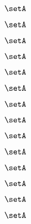 {\begin{forslides}
        \begin{equation}
            \label{eq:feedback-176}
            \setA
        \end{equation}

        \begin{equation}
            \label{eq:feedback-177}
            \setA
        \end{equation}

        \begin{equation}
            \label{eq:feedback-178}
            \setA
        \end{equation}

        \begin{equation}
            \label{eq:feedback-179}
            \setA
        \end{equation}

        \begin{equation}
            \label{eq:feedback-180}
            \setA
        \end{equation}

        \begin{equation}
            \label{eq:feedback-181}
            \setA
        \end{equation}

        \begin{equation}
            \label{eq:feedback-182}
            \setA
        \end{equation}

        \begin{equation}
            \label{eq:feedback-183}
            \setA
        \end{equation}

        \begin{equation}
            \label{eq:feedback-184}
            \setA
        \end{equation}

        \begin{equation}
            \label{eq:feedback-185}
            \setA
        \end{equation}

        \begin{equation}
            \label{eq:feedback-186}
            \setA
        \end{equation}

        \begin{equation}
            \label{eq:feedback-187}
            \setA
        \end{equation}

        \begin{equation}
            \label{eq:feedback-188}
            \setA
        \end{equation}

        \begin{equation}
            \label{eq:feedback-189}
            \setA
        \end{equation}

    \end{forslides}

}

